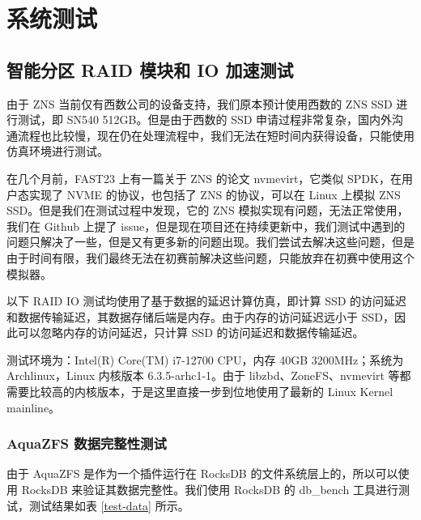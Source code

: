 \section{系统测试}

\subsection{智能分区 RAID 模块和 IO 加速测试}

由于 ZNS 当前仅有西数公司的设备支持，我们原本预计使用西数的 ZNS SSD 进行测试，即 SN540 512GB。但是由于西数的 SSD 申请过程非常复杂，国内外沟通流程也比较慢，现在仍在处理流程中，我们无法在短时间内获得设备，只能使用仿真环境进行测试。

在几个月前，FAST23 上有一篇关于 ZNS 的论文 nvmevirt\cite{kim_nvmevirt_nodate}，它类似 SPDK，在用户态实现了 NVME 的协议，也包括了 ZNS 的协议，可以在 Linux 上模拟 ZNS SSD。但是我们在测试过程中发现，它的 ZNS 模拟实现有问题，无法正常使用，我们在 Github 上提了 issue，但是现在项目还在持续更新中，我们测试中遇到的问题只解决了一些，但是又有更多新的问题出现。我们尝试去解决这些问题，但是由于时间有限，我们最终无法在初赛前解决这些问题，只能放弃在初赛中使用这个模拟器。

以下 RAID IO 测试均使用了基于数据的延迟计算仿真，即计算 SSD 的访问延迟和数据传输延迟，其数据存储后端是内存。由于内存的访问延迟远小于 SSD，因此可以忽略内存的访问延迟，只计算 SSD 的访问延迟和数据传输延迟。

测试环境为：Intel(R) Core(TM) i7-12700 CPU，内存 40GB 3200MHz；系统为 Archlinux，Linux 内核版本 6.3.5-arhc1-1。由于 libzbd、ZoneFS、nvmevirt 等都需要比较高的内核版本，于是这里直接一步到位地使用了最新的 Linux Kernel mainline。

\subsubsection{AquaZFS 数据完整性测试}

由于 AquaZFS 是作为一个插件运行在 RocksDB 的文件系统层上的，所以可以使用 RocksDB 来验证其数据完整性。我们使用 RocksDB 的 db\_bench 工具进行测试，测试结果如表 \ref{test-data} 所示。

